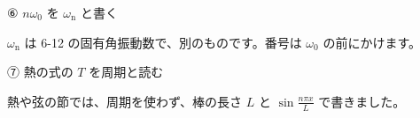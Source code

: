 \begingroup{}%
\noindent\begin{minipage}[t]{0.485\linewidth}\vspace{0pt}
\begin{tsumazuki}{⑥ $n\omega_0$ を $\omega_{\mathrm n}$ と書く}
\raggedright{}
$\omega_{\mathrm n}$ は 6-12 の固有角振動数で、別のものです。番号は $\omega_0$ の前にかけます。
\end{tsumazuki}
\end{minipage}\hfill
\begin{minipage}[t]{0.485\linewidth}\vspace{0pt}
\begin{tsumazuki}{⑦ 熱の式の $T$ を周期と読む}
\raggedright{}
熱や弦の節では、周期を使わず、棒の長さ $L$ と $\sin\frac{n\pi x}{L}$ で書きました。
\end{tsumazuki}
\end{minipage}\par
\endgroup

